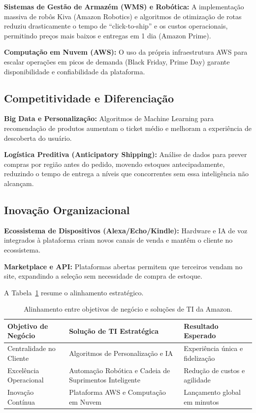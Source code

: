 \documentclass[12pt,a4paper,oneside]{article}
\begin{document}
\textbf{Sistemas de Gestão de Armazém (WMS) e Robótica:} A implementação massiva de robôs Kiva (Amazon Robotics) e algoritmos de otimização de rotas reduziu drasticamente o tempo de ``click-to-ship'' e os custos operacionais, permitindo preços mais baixos e entregas em 1 dia (Amazon Prime).

\textbf{Computação em Nuvem (AWS):} O uso da própria infraestrutura AWS para escalar operações em picos de demanda (Black Friday, Prime Day) garante disponibilidade e confiabilidade da plataforma.

\subsection{Competitividade e Diferenciação}

\textbf{Big Data e Personalização:} Algoritmos de Machine Learning para recomendação de produtos aumentam o ticket médio e melhoram a experiência de descoberta do usuário.

\textbf{Logística Preditiva (Anticipatory Shipping):} Análise de dados para prever compras por região antes do pedido, movendo estoques antecipadamente, reduzindo o tempo de entrega a níveis que concorrentes sem essa inteligência não alcançam.

\subsection{Inovação Organizacional}

\textbf{Ecossistema de Dispositivos (Alexa/Echo/Kindle):} Hardware e IA de voz integrados à plataforma criam novos canais de venda e mantêm o cliente no ecossistema.

\textbf{Marketplace e API:} Plataformas abertas permitem que terceiros vendam no site, expandindo a seleção sem necessidade de compra de estoque.

A Tabela~\ref{tab:alinhamento} resume o alinhamento estratégico.

\begin{table}[htb]
  \centering
  \caption{Alinhamento entre objetivos de negócio e soluções de TI da Amazon.}
  \label{tab:alinhamento}
  \begin{tabular}{p{3.5cm}p{5cm}p{4.5cm}}
    \toprule
    \textbf{Objetivo de Negócio} & \textbf{Solução de TI Estratégica} & \textbf{Resultado Esperado} \\
    \midrule
    Centralidade no Cliente & Algoritmos de Personalização e IA & Experiência única e fidelização \\
    Excelência Operacional & Automação Robótica e Cadeia de Suprimentos Inteligente & Redução de custos e agilidade \\
    Inovação Contínua & Plataforma AWS e Computação em Nuvem & Lançamento global em minutos \\
    \bottomrule
  \end{tabular}
\end{table}
\end{document}

